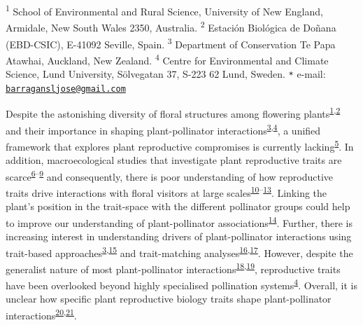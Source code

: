 \documentclass[
  12pt,
  a4paper,
]{article}
\begin{document}
\textsuperscript{1} School of Environmental and Rural Science, University of New England, Armidale, New South Wales 2350, Australia. \textsuperscript{2} Estación Biológica de Doñana (EBD-CSIC), E-41092 Seville, Spain. \textsuperscript{3} Department of Conservation \textbar{} Te Papa Atawhai, Auckland, New Zealand. \textsuperscript{4} Centre for Environmental and Climate Science, Lund University, Sölvegatan 37, S-223 62 Lund, Sweden. \texttt{*} e-mail: \href{mailto:barragansljose@gmail.com}{\nolinkurl{barragansljose@gmail.com}}

\doublespacing
\vspace{5mm}
\normalsize

Despite the astonishing diversity of floral structures among flowering plants\textsuperscript{\protect\hyperlink{ref-barrett2002}{1},\protect\hyperlink{ref-schiestl2013}{2}} and their importance in shaping plant-pollinator interactions\textsuperscript{\protect\hyperlink{ref-fenster2004}{3},\protect\hyperlink{ref-dellinger2020}{4}}, a unified framework that explores plant reproductive compromises is currently lacking\textsuperscript{\protect\hyperlink{ref-roddy2021}{5}}. In addition, macroecological studies that investigate plant reproductive traits are scarce\textsuperscript{\protect\hyperlink{ref-baude2016}{6}--\protect\hyperlink{ref-moeller2017}{9}} and consequently, there is poor understanding of how reproductive traits drive interactions with floral visitors at large scales\textsuperscript{\protect\hyperlink{ref-sargent2008}{10}--\protect\hyperlink{ref-ruger2018}{13}}. Linking the plant's position in the trait-space with the different pollinator groups could help to improve our understanding of plant-pollinator associations\textsuperscript{\protect\hyperlink{ref-dehling2016}{14}}. Further, there is increasing interest in understanding drivers of plant-pollinator interactions using trait-based approaches\textsuperscript{\protect\hyperlink{ref-fenster2004}{3},\protect\hyperlink{ref-rosas2014}{15}} and trait-matching analyses\textsuperscript{\protect\hyperlink{ref-stang2009}{16},\protect\hyperlink{ref-bartomeus2016}{17}}. However, despite the generalist nature of most plant-pollinator interactions\textsuperscript{\protect\hyperlink{ref-waser1996}{18},\protect\hyperlink{ref-olesen2002}{19}}, reproductive traits have been overlooked beyond highly specialised pollination systems\textsuperscript{\protect\hyperlink{ref-dellinger2020}{4}}. Overall, it is unclear how specific plant reproductive biology traits shape plant-pollinator interactions\textsuperscript{\protect\hyperlink{ref-tur2013}{20},\protect\hyperlink{ref-devaux2014}{21}}.
\end{document}
